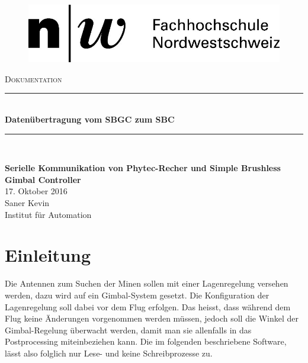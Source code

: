 \documentclass[12pt]{article} %
\begin{document}
	
	\begin{titlepage}
		
		\newcommand{\HRule}{\rule{\linewidth}{0.5mm}} %
		
		\centering %
		
		\begin{figure}[h] 
			\centering
			\includegraphics[width=.4\textwidth]{Logo-FHNW}
		\end{figure}
		
		\textsc{\Large Dokumentation}\\[0.5cm] %
		\begin{doublespace}
			\HRule \\[1cm]
			{ \huge \bfseries Datenübertragung vom SBGC zum SBC}\\[1cm] %
			\HRule \\[1cm]
		\end{doublespace}

		{\large \textbf{Serielle Kommunikation von Phytec-Recher und Simple Brushless Gimbal Controller}}\\[1cm] %

		{\large 17. Oktober 2016}\\[1cm] %
		
		{\large Saner Kevin}\\[1cm]
		{\large Institut für Automation}
		
		\vfill %
		
	\end{titlepage}
	
	\setcounter{page}{1}
	\pagestyle{fancy}
	\rfoot{\thepage}
	
	\section{Einleitung}
	Die Antennen zum Suchen der Minen sollen mit einer Lagenregelung versehen werden, dazu wird auf ein Gimbal-System gesetzt. Die Konfiguration der Lagenregelung soll dabei vor dem Flug erfolgen. Das heisst, dass während dem Flug keine Änderungen vorgenommen werden müssen, jedoch soll die Winkel der Gimbal-Regelung überwacht werden, damit man sie allenfalls in das Postprocessing miteinbeziehen kann. Die im folgenden beschriebene Software, lässt also folglich nur Lese- und keine Schreibprozesse zu.  
\end{document}

